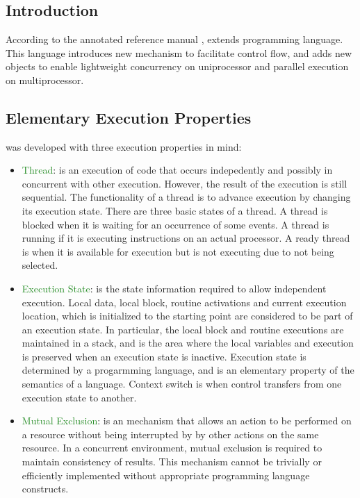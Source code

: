 \chapter{\uCPP} \label{uCPP}

\section{Introduction}
According to the \uCPPS annotated reference manual \cite{reference10}, \uCPPS
extends \CCS programming language. This language introduces new mechanism to
facilitate control flow, and adds new objects to enable lightweight concurrency
on uniprocessor and parallel execution on multiprocessor.

\iffalse
\section{Elementary Execution Properties}
\uCPPS was developed with three execution properties in mind:
\begin{itemize}
\item \textcolor{ForestGreen}{Thread}: is an execution of code that occurs
indepedently and possibly in concurrent with other execution. However, the
result of the execution is still sequential. The functionality of a thread is to
advance execution by changing its execution state. There are three basic states
of a thread. A thread is blocked when it is waiting for an occurrence of some
events. A thread is running if it is executing instructions on an actual
processor. A ready thread is when it is available for execution but is not
executing due to not being selected.
\item \textcolor{ForestGreen}{Execution State}: is the state information required
    to allow independent execution. Local data, local block, routine activations
    and current execution location, which is initialized to the starting point are considered to be part of an execution
    state. In particular, the local block and routine executions are maintained in a
    stack, and is the area where the local variables and execution is preserved
    when an execution state is inactive. Execution state is determined by a progarmming language, and is an elementary property of the semantics of a
language. Context switch is when control transfers from one execution state to
another.
\item \textcolor{ForestGreen}{Mutual Exclusion}: is an mechanism that allows an
    action to be performed on a resource without being interrupted by by other
    actions on the same resource. In a concurrent environment, mutual exclusion
    is required to maintain consistency of results. This mechanism cannot be
    trivially or efficiently implemented without appropriate programming
    language constructs.
\end{itemize}

